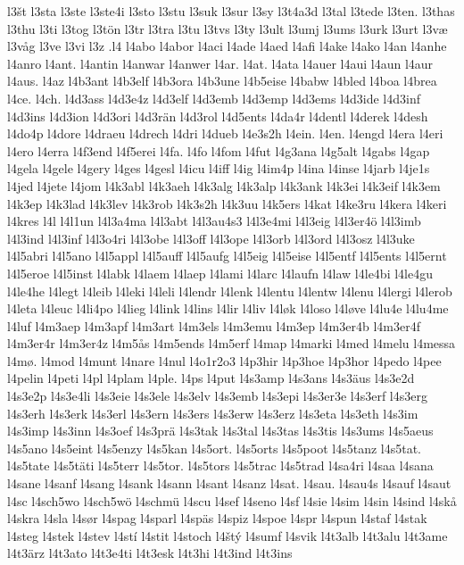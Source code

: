 {{l3št
l3sta
l3ste
l3ste4i
l3sto
l3stu
l3suk
l3sur
l3sy
l3t4a3d
l3tal
l3tede
l3ten.
l3thas
l3thu
l3ti
l3tog
l3tön
l3tr
l3tra
l3tu
l3tvs
l3ty
l3ult
l3umj
l3ums
l3urk
l3urt
l3væ
l3våg
l3ve
l3vi
l3z
.l4
l4abo
l4abor
l4aci
l4ade
l4aed
l4afi
l4ake
l4ako
l4an
l4anhe
l4anro
l4ant.
l4antin
l4anwar
l4anwer
l4ar.
l4at.
l4ata
l4auer
l4aui
l4aun
l4aur
l4aus.
l4az
l4b3ant
l4b3elf
l4b3ora
l4b3une
l4b5eise
l4babw
l4bled
l4boa
l4brea
l4ce.
l4ch.
l4d3ass
l4d3e4z
l4d3elf
l4d3emb
l4d3emp
l4d3ems
l4d3ide
l4d3inf
l4d3ins
l4d3ion
l4d3ori
l4d3rän
l4d3rol
l4d5ents
l4da4r
l4dentl
l4derek
l4desh
l4do4p
l4dore
l4draeu
l4drech
l4dri
l4dueb
l4e3s2h
l4ein.
l4en.
l4engd
l4era
l4eri
l4ero
l4erra
l4f3end
l4f5erei
l4fa.
l4fo
l4fom
l4fut
l4g3ana
l4g5alt
l4gabs
l4gap
l4gela
l4gele
l4gery
l4ges
l4gesl
l4icu
l4iff
l4ig
l4im4p
l4ina
l4inse
l4jarb
l4je1s
l4jed
l4jete
l4jom
l4k3abl
l4k3aeh
l4k3alg
l4k3alp
l4k3ank
l4k3ei
l4k3eif
l4k3em
l4k3ep
l4k3lad
l4k3lev
l4k3rob
l4k3s2h
l4k3uu
l4k5ers
l4kat
l4ke3ru
l4kera
l4keri
l4kres
l4l
l4l1un
l4l3a4ma
l4l3abt
l4l3au4s3
l4l3e4mi
l4l3eig
l4l3er4ö
l4l3imb
l4l3ind
l4l3inf
l4l3o4ri
l4l3obe
l4l3off
l4l3ope
l4l3orb
l4l3ord
l4l3osz
l4l3uke
l4l5abri
l4l5ano
l4l5appl
l4l5auff
l4l5aufg
l4l5eig
l4l5eise
l4l5entf
l4l5ents
l4l5ernt
l4l5eroe
l4l5inst
l4labk
l4laem
l4laep
l4lami
l4larc
l4laufn
l4law
l4le4bi
l4le4gu
l4le4he
l4legt
l4leib
l4leki
l4leli
l4lendr
l4lenk
l4lentu
l4lentw
l4lenu
l4lergi
l4lerob
l4leta
l4leuc
l4li4po
l4lieg
l4link
l4lins
l4lir
l4liv
l4løk
l4loso
l4løve
l4lu4e
l4lu4me
l4luf
l4m3aep
l4m3apf
l4m3art
l4m3els
l4m3emu
l4m3ep
l4m3er4b
l4m3er4f
l4m3er4r
l4m3er4z
l4m5ås
l4m5ends
l4m5erf
l4map
l4marki
l4med
l4melu
l4messa
l4mø.
l4mod
l4munt
l4nare
l4nul
l4o1r2o3
l4p3hir
l4p3hoe
l4p3hor
l4pedo
l4pee
l4pelin
l4peti
l4pl
l4plam
l4ple.
l4ps
l4put
l4s3amp
l4s3ans
l4s3äus
l4s3e2d
l4s3e2p
l4s3e4li
l4s3eie
l4s3ele
l4s3elv
l4s3emb
l4s3epi
l4s3er3e
l4s3erf
l4s3erg
l4s3erh
l4s3erk
l4s3erl
l4s3ern
l4s3ers
l4s3erw
l4s3erz
l4s3eta
l4s3eth
l4s3im
l4s3imp
l4s3inn
l4s3oef
l4s3prä
l4s3tak
l4s3tal
l4s3tas
l4s3tis
l4s3ums
l4s5aeus
l4s5ano
l4s5eint
l4s5enzy
l4s5kan
l4s5ort.
l4s5orts
l4s5poot
l4s5tanz
l4s5tat.
l4s5tate
l4s5täti
l4s5terr
l4s5tor.
l4s5tors
l4s5trac
l4s5trad
l4sa4ri
l4saa
l4sana
l4sane
l4sanf
l4sang
l4sank
l4sann
l4sant
l4sanz
l4sat.
l4sau.
l4sau4s
l4sauf
l4saut
l4sc
l4sch5wo
l4sch5wö
l4schmü
l4scu
l4sef
l4seno
l4sf
l4sie
l4sim
l4sin
l4sind
l4skå
l4skra
l4sla
l4sør
l4spag
l4sparl
l4späs
l4spiz
l4spoe
l4spr
l4spun
l4staf
l4stak
l4steg
l4stek
l4stev
l4stí
l4stit
l4stoch
l4štý
l4sumf
l4svik
l4t3alb
l4t3alu
l4t3ame
l4t3ärz
l4t3ato
l4t3e4ti
l4t3esk
l4t3hi
l4t3ind
l4t3ins
}}
